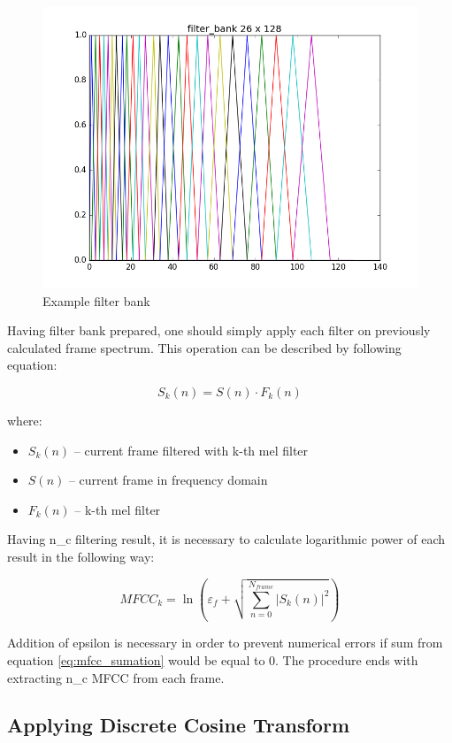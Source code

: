 \documentclass[magister]{dyplom}
\begin{document}
	\begin{figure} [!th]
		\centering
		\includegraphics[width=0.7\linewidth]{images/MFCC_filter_bank}
		\caption{Example filter bank}
		\label{fig:MFCC_filter_bank}
	\end{figure}

	Having filter bank prepared, one should simply apply each filter on previously calculated frame spectrum. This operation can be described by following equation:
	
	\begin{equation}
		S_k(n) = S(n) \cdot F_k(n)
	\end{equation}
	
	where:
	
	\begin{itemize}
		\item $S_k(n)$ -- current frame filtered with k-th mel filter
		\item $S(n)$ -- current frame in frequency domain
		\item $F_k(n)$ -- k-th mel filter
	\end{itemize}
	
	Having \gls{n_c} filtering result, it is necessary to calculate logarithmic power of each result in the following way:
	
	\begin{equation} \label{eq:mfcc_sumation}
		MFCC_k = \ln \left( \varepsilon_f + \sqrt{\sum_{n=0}^{N_{frame}} |S_k(n)|^2} \right)
	\end{equation}
	
	Addition of \gls{epsilon} is necessary in order to prevent numerical errors if sum from equation \ref{eq:mfcc_sumation} would be equal to 0. The procedure ends with extracting \gls{n_c} \gls{MFCC} from each frame.
	
	\subsection{Applying Discrete Cosine Transform}
	
\end{document}
